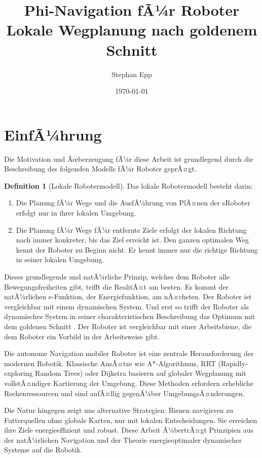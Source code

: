 ﻿\documentclass[a4paper,12pt]{article}
\title{Phi-Navigation fÃ¼r Roboter\\
	\large Lokale Wegplanung nach goldenem Schnitt}
\author{Stephan Epp}
\date{\today}
\theoremstyle{definition}
\newtheorem{definition}{Definition}
\begin{document}
	
\maketitle
\tableofcontents
\newpage

\section{EinfÃ¼hrung}
Die Motivation und Ãœberzeugung fÃ¼r diese Arbeit ist grundlegend durch die Beschreibung des folgenden Modells fÃ¼r Roboter geprÃ¤gt.

\begin{definition}[Lokale Robotermodell]
Das lokale Robotermodell besteht darin:
\begin{enumerate}
	\item Die Planung fÃ¼r Wege und die AusfÃ¼hrung von PlÃ¤nen der sRoboter erfolgt nur in ihrer lokalen Umgebung.
	\item Die Planung fÃ¼r Wege fÃ¼r entfernte Ziele erfolgt der lokalen Richtung nach immer konkreter, bis das Ziel erreicht ist. Den ganzen optimalen Weg kennt der Roboter zu Beginn nicht. Er kennt immer nur die richtige Richtung in seiner lokalen Umgebung.
\end{enumerate}	
\end{definition}

Dieses grundlegende und natÃ¼rliche Prinzip, welches dem Roboter alle Bewegungsfreiheiten gibt, trifft die RealitÃ¤t am besten. Es kommt der natÃ¼rlichen e-Funktion, der Energiefunktion, am nÃ¤chsten. Der Roboter ist vergleichbar mit einem dynamischen System. Und erst so trifft der Roboter als dynamisches System in seiner charakteristischen Beschreibung das Optimum mit dem goldenen Schnitt \cite{phi_energy}. Der Roboter ist vergleichbar mit einer Arbeitsbiene, die dem Roboter ein Vorbild in der Arbeitsweise gibt.

Die autonome Navigation mobiler Roboter ist eine zentrale Herausforderung der modernen Robotik. Klassische AnsÃ¤tze wie A*-Algorithmus, RRT (Rapidly-exploring Random Trees) oder Dijkstra basieren auf globaler Wegplanung mit vollstÃ¤ndiger Kartierung der Umgebung. Diese Methoden erfordern erhebliche Rechenressourcen und sind anfÃ¤llig gegenÃ¼ber UmgebungsÃ¤nderungen.

Die Natur hingegen zeigt uns alternative Strategien: Bienen navigieren zu Futterquellen ohne globale Karten, nur mit lokalen Entscheidungen. Sie erreichen ihre Ziele energieeffizient und robust. Diese Arbeit Ã¼bertrÃ¤gt Prinzipien aus der natÃ¼rlichen Navigation und der Theorie energieoptimaler dynamischer Systeme auf die Robotik.
\end{document}
